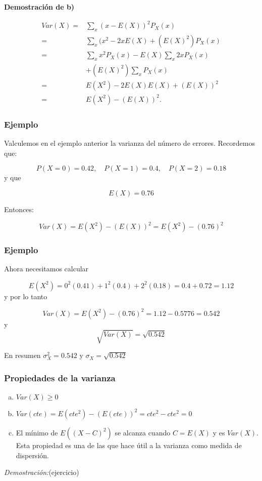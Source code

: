 \documentclass[handout]{beamer}\usepackage[]{graphicx}\usepackage[]{color}
\renewcommand{\geq}{\geqslant}
\theoremstyle{plain}
\theoremstyle{definition}
\begin{document}
\begin{frame}
\textbf{Demostración de b)}

\begin{align*}
Var(X)= & \sum_{x}(x-E(X))^2 P_{X}(x)\\
=& \sum_{x}(x^2 -2 x E(X)+(E(X)^2) P_{X}(x)\\
=& \sum_{x}x^2P_{X}(x) -  E(X)\sum_{x}2 x P_{X}(x)\\
 &+(E(X)^2)\sum_{x} P_{X}(x)\\
=& E(X^2)- 2 E(X) E(X) + (E(X))^2\\
=& E(X^2)-(E(X))^2.
\end{align*}

\end{frame}

\begin{frame}

\frametitle{Ejemplo}
   Valculemos en  el ejemplo anterior la varianza del número de errores. Recordemos que:
   
    $$P(X=0)=0.42,\quad P(X=1)=0.4, \quad P(X=2)=0.18$$
    y que
    
    $$E(X)=0.76$$

    Entonces:
    
    $$Var(X)=E(X^2)-(E(X))^2 = E(X^2)-(0.76)^2$$
\end{frame}

\begin{frame}

\frametitle{Ejemplo}
  Ahora necesitamos calcular 
  
  $$E(X^2)= 0^2 (0.41)+ 1^2 (0.4)+ 2^2 (0.18)=0.4+0.72=1.12$$
  y por lo tanto
  
  $$Var(X)= E(X^2)-(0.76)^2=1.12-0.5776=0.542$$
  y $$\sqrt{Var(X)}=\sqrt{0.542}$$

  En resumen $\sigma_{X}^2=0.542$ y $\sigma_{X}=\sqrt{0.542}$
     
\end{frame}

\begin{frame}
\frametitle{Propiedades de la varianza}
\begin{enumerate}[a)]
\item $Var(X)\geq 0$
\item $Var(cte)=E(cte^2)-(E(cte))^2= cte^2 - cte^2=0$
\item El mínimo de $E((X-C)^2)$ se alcanza cuando $C=E(X)$ y es $Var(X)$. Esta propiedad es una de las que hace útil a la varianza como medida de dispersión.
\end{enumerate}

\textit{Demostración:}(ejercicio)

\end{frame}
\end{document}
